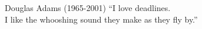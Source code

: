 \vspace*{\fill}
\raggedleft
\thispagestyle{empty} %
\begin{chapquote}{Douglas Adams (1965-2001)}
  ``I love deadlines. \\    
  I like the whooshing sound they make as they fly by.''
\end{chapquote}
\vspace*{\fill}